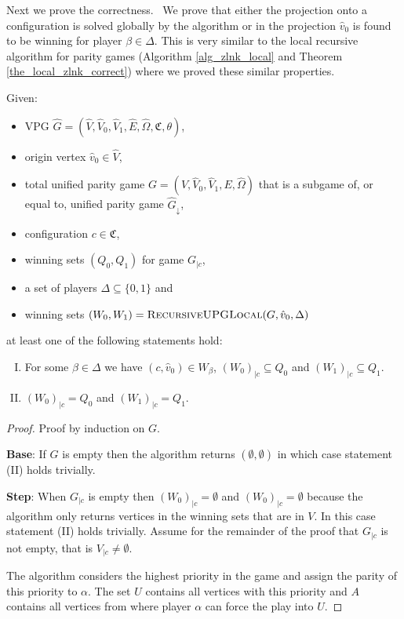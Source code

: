 Next we prove the correctness. \ We prove that either the projection onto a configuration is solved globally by the algorithm or in the projection $\hat{v}_0$ is found to be winning for player $\beta \in \Delta$. This is very similar to the local recursive algorithm for parity games (Algorithm \ref{alg_zlnk_local} and Theorem \ref{the_local_zlnk_correct}) where we proved these similar properties.
\begin{theorem}
	Given:
	\begin{itemize}
		\item VPG $\hat{G} = (\hat{V}, \hat{V}_0,\hat{V}_1,\hat{E},\hat{\Omega},\mathfrak{C},\theta)$,
		\item origin vertex $\hat{v}_0 \in \hat{V}$,
		\item total unified parity game $G = (V, \hat{V}_0, \hat{V}_1,E,\hat{\Omega})$ that is a subgame of, or equal to, unified parity game $\hat{G}_{\downarrow}$,
		\item configuration $c\in \mathfrak{C}$,
		\item winning sets $(Q_0,Q_1)$ for game $G_{|c}$,
		\item a set of players $\Delta \subseteq \{0,1\}$ and
		\item winning sets $(W_0, W_1) = \textsc{RecursiveUPGLocal}(G,\hat{v}_0,\Delta)$
	\end{itemize}
	at least one of the following statements hold:
	\begin{enumerate}[(I)]
		\item For some $\beta \in \Delta$ we have $(c,\hat{v}_0) \in W_\beta$, $(W_0)_{|c} \subseteq Q_0$ and $(W_1)_{|c} \subseteq Q_1$.
		\item $(W_0)_{|c} = Q_0$ and $(W_1)_{|c} = Q_1$.
	\end{enumerate}
	\begin{proof}
		Proof by induction on $G$.
		
		\textbf{Base}: If $G$ is empty then the algorithm returns $(\emptyset,\emptyset)$ in which case statement (II) holds trivially.
		
		\textbf{Step}:
		When $G_{|c}$ is empty then $(W_0)_{|c} = \emptyset$ and $(W_0)_{|c} = \emptyset$ because the algorithm only returns vertices in the winning sets that are in $V$. In this case statement (II) holds trivially. Assume for the remainder of the proof that $G_{|c}$ is not empty, that is $V_{|c} \neq \emptyset$.
		
		The algorithm considers the highest priority in the game and assign the parity of this priority to $\alpha$. The set $U$ contains all vertices with this priority and $A$ contains all vertices from where player $\alpha$ can force the play into $U$.
		

\end{proof}
\end{theorem}
